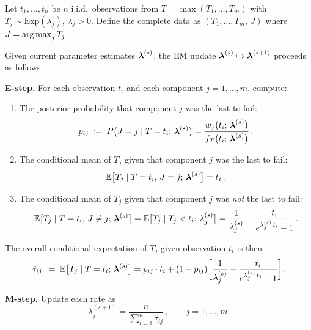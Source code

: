 \begin{proposition}
  \label{prop:em-algorithm}
  Let $t_1,\ldots,t_n$ be $n$ i.i.d.\ observations from
  $T = \max(T_1,\ldots,T_m)$ with $T_j \sim \mathrm{Exp}(\lambda_j)$,
  $\lambda_j > 0$.  Define the complete data as
  $(T_1,\ldots,T_m,\, J)$ where $J = \operatorname*{arg\,max}_j T_j$.

  Given current parameter estimates $\boldsymbol{\lambda}^{(s)}$, the EM update
  $\boldsymbol{\lambda}^{(s)} \mapsto \boldsymbol{\lambda}^{(s+1)}$ proceeds as follows.

  \medskip\noindent
  \textbf{E-step.}\enspace
  For each observation $t_i$ and each component $j = 1,\ldots,m$,
  compute:
  \begin{enumerate}
    \item[\textup{(i)}]
      The posterior probability that component $j$ was the last to fail:
      \begin{equation}
        \label{eq:em-posterior}
        p_{ij}
        \;\coloneqq\; P\bigl(J = j \mid T = t_i;\, \boldsymbol{\lambda}^{(s)}\bigr)
        = \frac{w_j\bigl(t_i;\, \boldsymbol{\lambda}^{(s)}\bigr)}
              {f_T\bigl(t_i;\, \boldsymbol{\lambda}^{(s)}\bigr)}\,.
      \end{equation}

    \item[\textup{(ii)}]
      The conditional mean of $T_j$ given that component $j$ was the
      last to fail:
      \begin{equation}
        \label{eq:em-exact}
        \mathbb{E}\bigl[T_j \mid T = t_i,\, J = j;\, \boldsymbol{\lambda}^{(s)}\bigr] = t_i\,.
      \end{equation}

    \item[\textup{(iii)}]
      The conditional mean of $T_j$ given that component $j$ was
      \emph{not} the last to fail:
      \begin{equation}
        \label{eq:em-truncated}
        \mathbb{E}\bigl[T_j \mid T = t_i,\, J \neq j;\, \boldsymbol{\lambda}^{(s)}\bigr]
        = \mathbb{E}\bigl[T_j \mid T_j < t_i;\, \lambda_j^{(s)}\bigr]
        = \frac{1}{\lambda_j^{(s)}}
          - \frac{t_i}{e^{\lambda_j^{(s)}\, t_i} - 1}\,.
      \end{equation}
  \end{enumerate}
  The overall conditional expectation of $T_j$ given observation $t_i$
  is then
  \begin{equation}
    \label{eq:em-etj}
    \hat\tau_{ij}
    \;\coloneqq\; \mathbb{E}\bigl[T_j \mid T = t_i;\, \boldsymbol{\lambda}^{(s)}\bigr]
    = p_{ij}\cdot t_i
      + (1 - p_{ij})\biggl[
        \frac{1}{\lambda_j^{(s)}}
        - \frac{t_i}{e^{\lambda_j^{(s)}\, t_i} - 1}
      \biggr].
  \end{equation}

  \medskip\noindent
  \textbf{M-step.}\enspace
  Update each rate as
  \begin{equation}
    \label{eq:em-mstep}
    \lambda_j^{(s+1)}
    = \frac{n}{\displaystyle\sum_{i=1}^{n} \hat\tau_{ij}}\,,
    \qquad j = 1,\ldots,m.
  \end{equation}
\end{proposition}


